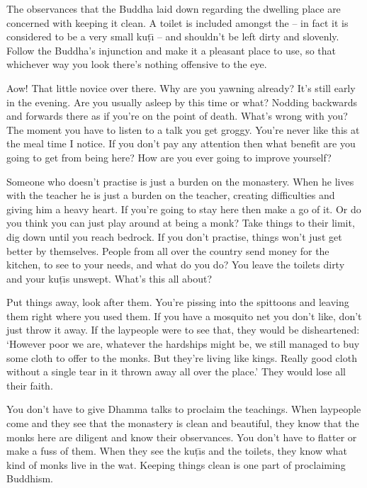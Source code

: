 The observances that the Buddha laid down regarding the dwelling place are concerned with keeping it clean. A toilet is included amongst the  -- in fact it is considered to be a very small ku\d{t}\={\i} -- and shouldn't be left dirty and slovenly. Follow the Buddha's injunction and make it a pleasant place to use, so that whichever way you look there's nothing offensive to the eye.

Aow! That little novice over there. Why are you yawning already? It's still early in the evening. Are you usually asleep by this time or what? Nodding backwards and forwards there as if you're on the point of death. What's wrong with you? The moment you have to listen to a talk you get groggy. You're never like this at the meal time I notice. If you don't pay any attention then what benefit are you going to get from being here? How are you ever going to improve yourself?

Someone who doesn't practise is just a burden on the monastery. When he lives with the teacher he is just a burden on the teacher, creating difficulties and giving him a heavy heart. If you're going to stay here then make a go of it. Or do you think you can just play around at being a monk? Take things to their limit, dig down until you reach bedrock. If you don't practise, things won't just get better by themselves. People from all over the country send money for the kitchen, to see to your needs, and what do you do? You leave the toilets dirty and your ku\d{t}\={\i}s unswept. What's this all about?

Put things away, look after them. You're pissing into the spittoons and leaving them right where you used them. If you have a mosquito net you don't like, don't just throw it away. If the laypeople were to see that, they would be disheartened: `However poor we are, whatever the hardships might be, we still managed to buy some cloth to offer to the monks. But they're living like kings. Really good cloth without a single tear in it thrown away all over the place.' They would lose all their faith.

You don't have to give Dhamma talks to proclaim the teachings. When laypeople come and they see that the monastery is clean and beautiful, they know that the monks here are diligent and know their observances. You don't have to flatter or make a fuss of them. When they see the ku\d{t}\={\i}s and the toilets, they know what kind of monks live in the wat. Keeping things clean is one part of proclaiming Buddhism.

